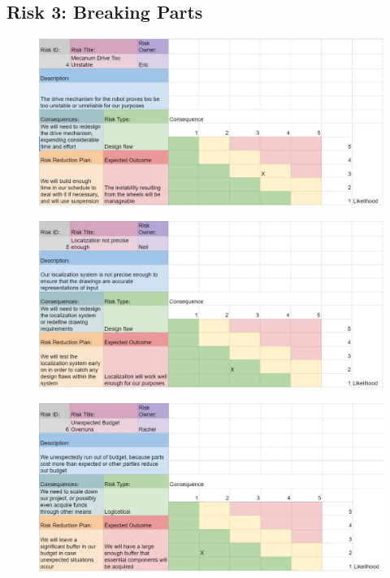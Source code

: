 \subsection{Risk 3: Breaking Parts}
\begin{figure}[!ht]
\centering
\includegraphics[width=0.98\columnwidth]{risks/risk4.JPG}
\label{fig:risk4}
\end{figure}
\begin{figure}[!ht]
\centering
\includegraphics[width=0.98\columnwidth]{risks/risk5.JPG}
\label{fig:risk5}
\end{figure}
\begin{figure}[!ht]
\centering
\includegraphics[width=0.98\columnwidth]{risks/risk6.JPG}
\label{fig:risk6}
\end{figure}

\clearpage
